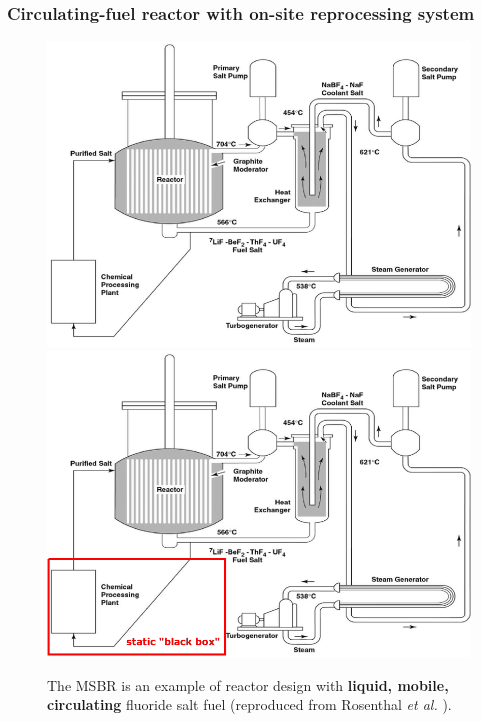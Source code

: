 \begin{frame} %
\frametitle{Circulating-fuel reactor with on-site reprocessing system}
\vspace{-2mm}
\begin{figure}[t]
		\begin{overprint}
			\includegraphics[height=0.6\textwidth]{./images/msbr_scheme.png}
			\onslide<2>\includegraphics[height=0.6\textwidth]{./images/msbr_scheme_box.png}
		\end{overprint}
	\caption{The MSBR is an example of reactor design with 
	\textbf{liquid, mobile, circulating} fluoride salt fuel 
	(reproduced from Rosenthal \emph{et al.} 
	\cite{rosenthal_molten-salt_1970}).}
\end{figure}   

\end{frame}

